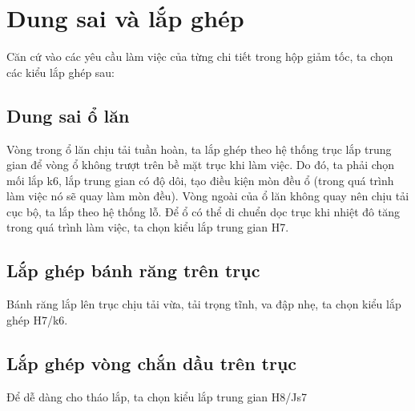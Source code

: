 \chapter{Dung sai và lắp ghép}
Căn cứ vào các yêu cầu làm việc của từng chi tiết trong hộp giảm tốc, ta chọn các
kiểu lắp ghép sau:
\section{Dung sai ổ lăn}
Vòng trong ổ lăn chịu tải tuần hoàn, ta lắp ghép theo hệ thống trục lắp trung gian để
vòng ổ không trượt trên bề mặt trục khi làm việc. Do đó, ta phải chọn mối lắp k6, lắp
trung gian có độ dôi, tạo điều kiện mòn đều ổ (trong quá trình làm việc nó sẽ quay làm
mòn đều).
Vòng ngoài của ổ lăn không quay nên chịu tải cục bộ, ta lắp theo hệ thống lỗ. Để ổ có
thể di chuển dọc trục khi nhiệt đô tăng trong quá trình làm việc, ta chọn kiểu lắp trung
gian H7.
\section{Lắp ghép bánh răng trên trục}
Bánh răng lắp lên trục chịu tải vừa, tải trọng tĩnh, va đập nhẹ, ta chọn kiểu lắp ghép
H7/k6.
\section{Lắp ghép vòng chắn dầu trên trục}
Để dễ dàng cho tháo lắp, ta chọn kiểu lắp trung gian H8/Js7
